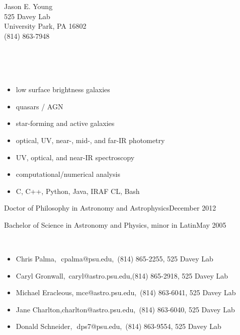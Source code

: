 

\begin{small}

\begin{center}
{\Large Jason E. Young}\\
525 Davey Lab\\
University Park, PA 16802\\
(814) 863-7948\\
\\
\\


\end{center}
\bigskip


\\
\begin{itemize}
 \item low surface brightness galaxies
 \item quasars / AGN
 \item star-forming and active galaxies
 \item optical, UV, near-, mid-, and far-IR photometry
 \item UV, optical, and near-IR spectroscopy
 \item computational/numerical analysis
 \item C, C++, Python, Java, IRAF CL, Bash
\end{itemize}


{Doctor of Philosophy in Astronomy and Astrophysics}{December 2012}

{Bachelor of Science in Astronomy and Physics, minor in Latin}{May 2005}


\\
\begin{itemize}
\item Chris Palma,\qquad\,\, cpalma@psu.edu,\qquad\quad\, (814) 865-2255, 525 Davey Lab
\item Caryl Gronwall,\quad\, caryl@astro.psu.edu,\qquad (814) 865-2918, 525 Davey Lab
\item Michael Eracleous, mce@astro.psu.edu,\qquad\, (814) 863-6041, 525 Davey Lab
\item Jane Charlton,\quad\quad charlton@astro.psu.edu,\, (814) 863-6040, 525 Davey Lab
\item Donald Schneider,\,\, dps7@psu.edu,\qquad\qquad\, (814) 863-9554, 525 Davey Lab
\end{itemize}


\end{small}
